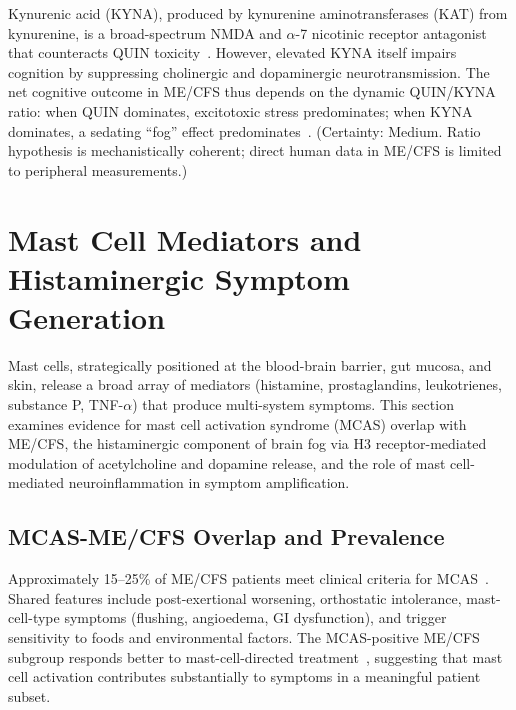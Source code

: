 \begin{hypothesis}
\label{hyp:ch15-kynurenine-KYNA-balance}
Kynurenic acid (KYNA), produced by kynurenine aminotransferases (KAT) from kynurenine, is a broad-spectrum NMDA and $\alpha$-7 nicotinic receptor antagonist that counteracts QUIN toxicity~\cite{Bai2021kynurenineTherapy, Huang2020IDO}. However, elevated KYNA itself impairs cognition by suppressing cholinergic and dopaminergic neurotransmission. The net cognitive outcome in ME/CFS thus depends on the dynamic QUIN/KYNA ratio: when QUIN dominates, excitotoxic stress predominates; when KYNA dominates, a sedating ``fog'' effect predominates~\cite{Bai2021kynurenineTherapy}.
(Certainty: Medium. Ratio hypothesis is mechanistically coherent; direct human data in ME/CFS is limited to peripheral measurements.)
\end{hypothesis}


\section{Mast Cell Mediators and Histaminergic Symptom Generation}
\label{sec:ch15-mast-cells}

Mast cells, strategically positioned at the blood-brain barrier, gut mucosa, and skin, release a broad array of mediators (histamine, prostaglandins, leukotrienes, substance P, TNF-$\alpha$) that produce multi-system symptoms. This section examines evidence for mast cell activation syndrome (MCAS) overlap with ME/CFS, the histaminergic component of brain fog via H3 receptor-mediated modulation of acetylcholine and dopamine release, and the role of mast cell-mediated neuroinflammation in symptom amplification.

\subsection{MCAS-ME/CFS Overlap and Prevalence}

Approximately 15--25\% of ME/CFS patients meet clinical criteria for MCAS~\cite{Frioni2025MCAS}. Shared features include post-exertional worsening, orthostatic intolerance, mast-cell-type symptoms (flushing, angioedema, GI dysfunction), and trigger sensitivity to foods and environmental factors. The MCAS-positive ME/CFS subgroup responds better to mast-cell-directed treatment~\cite{Novak2022, Frioni2025MCAS}, suggesting that mast cell activation contributes substantially to symptoms in a meaningful patient subset.

